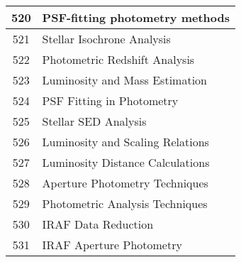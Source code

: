 \begin{table}[htbp]
\begin{tabular}{|c|l|}
520 & PSF-fitting photometry methods \\
\hline
521 & Stellar Isochrone Analysis \\
\hline
522 & Photometric Redshift Analysis \\
\hline
523 & Luminosity and Mass Estimation \\
\hline
524 & PSF Fitting in Photometry \\
\hline
525 & Stellar SED Analysis \\
\hline
526 & Luminosity and Scaling Relations \\
\hline
527 & Luminosity Distance Calculations \\
\hline
528 & Aperture Photometry Techniques \\
\hline
529 & Photometric Analysis Techniques \\
\hline
530 & IRAF Data Reduction \\
\hline
531 & IRAF Aperture Photometry \\
\hline
\end{tabular}
\end{table}
